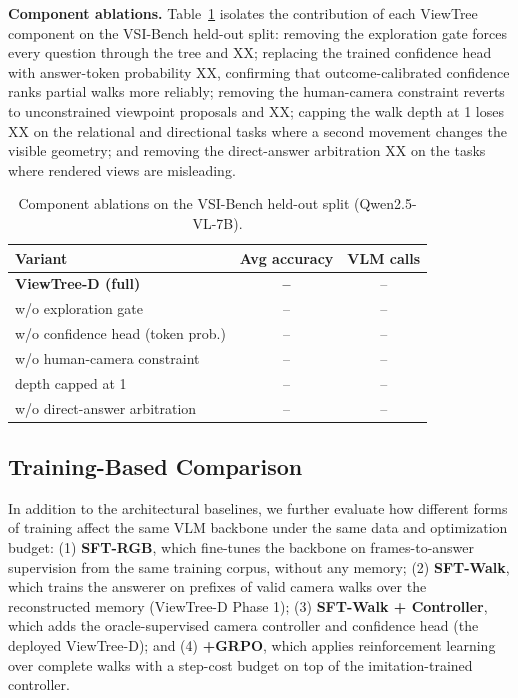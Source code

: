\noindent\textbf{Component ablations.} Table~\ref{tab:vt_component_ablation} isolates the contribution of each ViewTree component on the VSI-Bench held-out split: removing the exploration gate forces every question through the tree and XX; replacing the trained confidence head with answer-token probability XX, confirming that outcome-calibrated confidence ranks partial walks more reliably; removing the human-camera constraint reverts to unconstrained viewpoint proposals and XX; capping the walk depth at 1 loses XX on the relational and directional tasks where a second movement changes the visible geometry; and removing the direct-answer arbitration XX on the tasks where rendered views are misleading.

\begin{table}[h]
	\centering
	\small
	\begin{tabular}{lcc}
		\toprule
		\textbf{Variant} & \textbf{Avg accuracy} & \textbf{VLM calls} \\ \midrule
		\textbf{ViewTree-D (full)}          & \textbf{--} & -- \\
		\;\;w/o exploration gate            & --          & -- \\
		\;\;w/o confidence head (token prob.)& --         & -- \\
		\;\;w/o human-camera constraint     & --          & -- \\
		\;\;depth capped at 1               & --          & -- \\
		\;\;w/o direct-answer arbitration   & --          & -- \\ \bottomrule
	\end{tabular}
	\caption{Component ablations on the VSI-Bench held-out split (Qwen2.5-VL-7B).}
	\label{tab:vt_component_ablation}
	\vspace{-0.2in}
\end{table}

\subsection{Training-Based Comparison}
\label{sec:training_baseline}

In addition to the architectural baselines, we further evaluate how different forms of training affect the same VLM backbone under the same data and optimization budget: (1) \textbf{SFT-RGB}, which fine-tunes the backbone on frames-to-answer supervision from the same training corpus, without any memory; (2) \textbf{SFT-Walk}, which trains the answerer on prefixes of valid camera walks over the reconstructed memory (ViewTree-D Phase 1); (3) \textbf{SFT-Walk + Controller}, which adds the oracle-supervised camera controller and confidence head (the deployed ViewTree-D); and (4) \textbf{+GRPO}, which applies reinforcement learning over complete walks with a step-cost budget on top of the imitation-trained controller.

